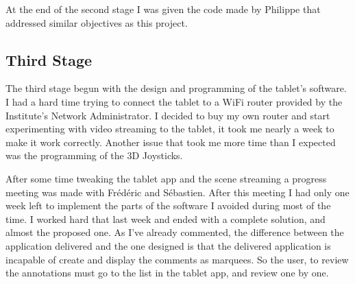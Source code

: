 At the end of the second stage I was given the code made by Philippe that addressed similar objectives as this project.

\subsection{Third Stage}
The third stage begun with the design and programming of the tablet's software. I had a hard time trying to connect the tablet to a WiFi router provided by the Institute's Network Administrator. I decided to buy my own router and start experimenting with video streaming to the tablet, it took me nearly a week to make it work correctly. Another issue that took me more time than I expected was the programming of the 3D Joysticks. 

After some time tweaking the tablet app and the scene streaming a progress meeting was made with Frédéric and Sébastien. After this meeting I had only one week left to implement the parts of the software I avoided during most of the time. I worked hard that last week and ended with a complete solution, and almost the proposed one. As I've already commented, the difference between the application delivered and the one designed is that the delivered application is incapable of create and display the comments as marquees. So the user, to review the annotations must go to the list in the tablet app, and review one by one.